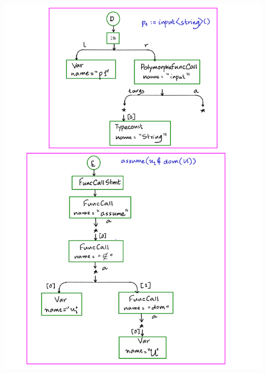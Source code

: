 \documentclass[12pts, a4paper]{article}
\begin{document}
\begin{center}
\includegraphics[width=\textwidth]{../images/ACT-AST-11.png}


\end{center}
\end{document}

